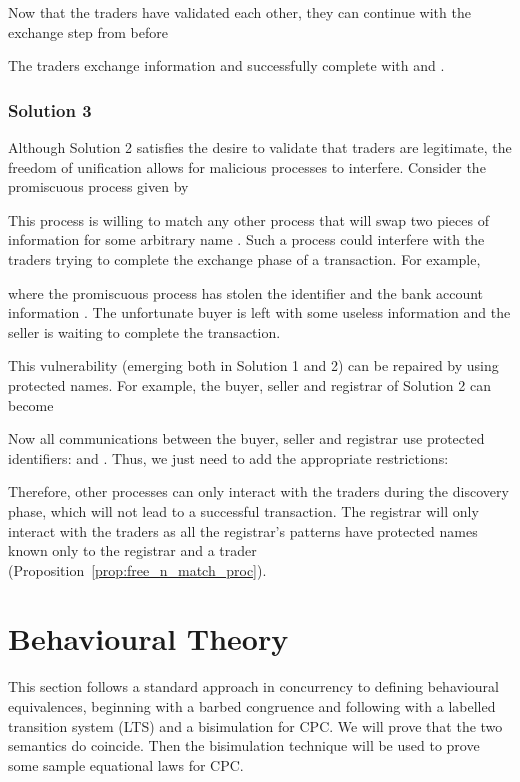 \documentclass{LMCS}
\begin{document}
Now that the traders have validated each other, they can continue
with the exchange step from before

The traders exchange information and successfully complete with 
 and .


\subsubsection*{Solution 3}
\label{sec:example:sol3}
Although Solution 2 satisfies the desire to validate that
traders are legitimate, the freedom of unification allows for
malicious processes to interfere. Consider the promiscuous
process  given by

This process is willing to match any other process that will swap
two pieces of information for some arbitrary name . Such a
process could interfere with the traders trying to complete the
exchange phase of a transaction. For example,

where the promiscuous process has stolen the identifier  and the
bank account information . The unfortunate buyer is left with some
useless information  and the seller is waiting to complete the
transaction.

This vulnerability (emerging both in Solution 1 and 2) can be repaired by using protected
names.
For example, the buyer, seller and registrar of Solution 2 can become 

Now all communications between the buyer, seller and registrar
use protected identifiers:  and .
Thus, we just need to add the appropriate restrictions:

Therefore, other processes can only interact with the traders during
the discovery phase, which will not lead to a successful
transaction. The registrar will only interact with the
traders as all the registrar's patterns have protected names
known only to the registrar and a trader (Proposition~\ref{prop:free_n_match_proc}).


\section{Behavioural Theory}
\label{sec:bisim}
\newcommand{\usedby}[1]{}


This section follows a standard approach in concurrency to defining
behavioural equivalences, beginning with a barbed congruence and
following with a labelled transition system (LTS) and a bisimulation
for CPC. We will prove that the two semantics do coincide. Then the
bisimulation technique will be used to prove some sample equational
laws for CPC.
\nobreak
\end{document}

